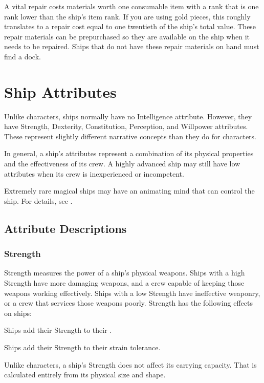     A vital repair costs materials worth one consumable item with a rank that is one rank lower than the ship's item rank.
    If you are using gold pieces, this roughly translates to a repair cost equal to one twentieth of the ship's total value.
    These repair materials can be prepurchased so they are available on the ship when it needs to be repaired.
    Ships that do not have these repair materials on hand must find a dock.

\section{Ship Attributes}
  Unlike characters, ships normally have no Intelligence attribute.
  However, they have Strength, Dexterity, Constitution, Perception, and Willpower attributes.
  These represent slightly different narrative concepts than they do for characters.

  In general, a ship's attributes represent a combination of its physical properties and the effectiveness of its crew.
  A highly advanced ship may still have low attributes when its crew is inexperienced or incompetent.

  Extremely rare magical ships may have an animating mind that can control the ship.
  For details, see .

  \subsection{Attribute Descriptions}

    \subsubsection{Strength}
      Strength measures the power of a ship's physical weapons.
      Ships with a high Strength have more damaging weapons, and a crew capable of keeping those weapons working effectively.
      Ships with a low Strength have ineffective weaponry, or a crew that services those weapons poorly.
      Strength has the following effects on ships:
      \begin{raggeditemize}
        \item Ships add their Strength to their .
        \item Ships add their Strength to their strain tolerance.
      \end{raggeditemize}

      Unlike characters, a ship's Strength does not affect its carrying capacity.
      That is calculated entirely from its physical size and shape.

